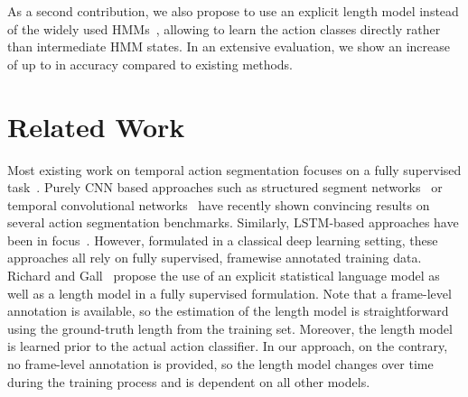 \documentclass[10pt,twocolumn,letterpaper]{article}
\begin{document}
As a second contribution, we also propose to use an explicit length model instead of the widely used
HMMs~\cite{kuehne2017weakly,richard2017weakly,koller2016deephand,koller2017resign},
allowing to learn the action classes directly rather than intermediate HMM states.
In an extensive evaluation, we show an increase of up to  in accuracy
compared to existing methods.


\section{Related Work}
\label{sec:related_work}

Most existing work on temporal action segmentation focuses on a fully supervised
task~\cite{kuehne16end,rohrbach2012database,tang2012learning,lea2016segmental,vo2014stochastic,ni2014multiple,eyjolfsdottir2014detecting,zhao2017segment,lea2017temporal,yeung2016endtoend,singh16multistream}.
Purely CNN based approaches such as structured segment networks~\cite{zhao2017segment}
or temporal convolutional networks~\cite{lea2017temporal} have recently shown
convincing results on several action segmentation benchmarks. Similarly, LSTM-based
approaches have been in focus~\cite{yeung2016endtoend,singh16multistream}. However,
formulated in a classical deep learning setting, these approaches all rely on fully
supervised, \ie framewise annotated training data.
Richard and Gall~\cite{richard2016temporal} propose
the use of an explicit statistical language model as well as a length model in a fully
supervised formulation.
Note that a frame-level annotation is available, so the estimation of the length model is straightforward
using the ground-truth length from the training set. Moreover, the length model is
learned prior to the actual action classifier. In our approach, on the contrary, no
frame-level annotation is provided, so the length model changes over time during the
training process and is dependent on all other models.
\end{document}
